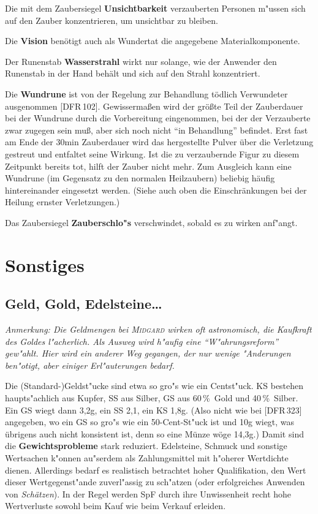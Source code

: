 \documentclass[10pt,a4paper,germanpar]{article}
\begin{document}
Die mit dem Zaubersiegel \textbf{Unsichtbarkeit} verzauberten Personen 
m"ussen sich auf den Zauber konzentrieren, um unsichtbar zu bleiben.

Die \textbf{Vision} benötigt auch als Wundertat die angegebene
Materialkomponente.

Der Runenstab \textbf{Wasserstrahl} wirkt nur solange, wie der
Anwender den Runenstab in der Hand behält und sich auf den Strahl
konzentriert.

Die \textbf{Wundrune} ist von der Regelung zur Behandlung tödlich
Verwundeter ausgenommen [DFR\,102]. Gewissermaßen wird der größte Teil
der Zauberdauer bei der Wundrune durch die Vorbereitung eingenommen,
bei der der Verzauberte zwar zugegen sein muß, aber sich noch nicht
"`in Behandlung"' befindet. Erst fast am Ende der 30min Zauberdauer
wird das hergestellte Pulver über die Verletzung gestreut und
entfaltet seine Wirkung. Ist die zu verzaubernde Figur zu diesem
Zeitpunkt bereits tot, hilft der Zauber nicht mehr. Zum Ausgleich kann
eine Wundrune (im Gegensatz zu den normalen Heilzaubern) beliebig
häufig hintereinander eingesetzt werden. (Siehe auch oben die
Einschränkungen bei der Heilung ernster Verletzungen.)

Das Zaubersiegel \textbf{Zauberschlo"s} verschwindet, sobald es zu
wirken anf"angt.

\section{Sonstiges}

\subsection{Geld, Gold, Edelsteine\dots}

\emph{Anmerkung: Die Geldmengen bei \textsc{Midgard} wirken oft
  astronomisch, die Kaufkraft des Goldes l"acherlich. Als Ausweg wird
  h"aufig eine "`W"ahrungsreform"' gew"ahlt. Hier wird ein anderer Weg
  gegangen, der nur wenige "Anderungen ben"otigt, aber einiger
  Erl"auterungen bedarf.}

Die (Standard-)Geldst"ucke sind etwa so gro"s wie ein Centst"uck. KS
bestehen haupts"achlich aus Kupfer, SS aus Silber, GS aus 60\,\%\ Gold
und 40\,\%\ Silber. Ein GS wiegt dann 3,2g, ein SS 2,1, ein KS 1,8g.
(Also nicht wie bei [DFR\,323] angegeben, wo ein GS so gro"s wie ein
50-Cent-St"uck ist und 10g wiegt, was übrigens auch nicht konsistent
ist, denn so eine Münze wöge 14,3g.) Damit sind die
\textbf{Gewichtsprobleme} stark reduziert. Edelsteine, Schmuck und
sonstige Wertsachen k"onnen au"serdem als Zahlungsmittel mit h"oherer
Wertdichte dienen. Allerdings bedarf es realistisch betrachtet hoher
Qualifikation, den Wert dieser Wertgegenst"ande zuverl"assig zu
sch"atzen (oder erfolgreiches Anwenden von \emph{Schätzen}). In der
Regel werden SpF durch ihre Unwissenheit recht hohe Wertverluste
sowohl beim Kauf wie beim Verkauf erleiden.
\end{document}
